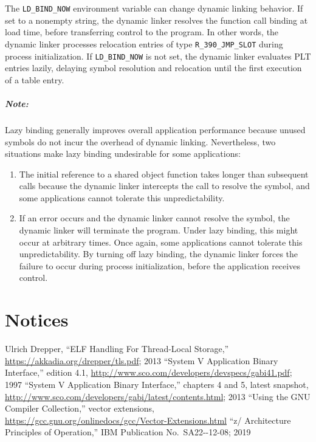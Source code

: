 \documentclass[english,11pt,twoside,toc=bib,toc=idx]{scrreprt}
\newcommand{\ARCH}{z/\kern-1pt Ar\-chi\-tec\-ture}
\newcommand{\ARCH}{ESA/390}
\begin{document}
The \texttt{LD\_BIND\_NOW} environment variable can change dynamic
linking behavior.  If set to a nonempty string, the dynamic linker
resolves the function call binding at load time, before transferring
control to the program.  In other words, the dynamic linker processes
relocation entries of type \texttt{R\_390\_JMP\_SLOT} during process
initialization.  If \texttt{LD\_BIND\_NOW} is not set, the dynamic
linker evaluates PLT entries lazily, delaying symbol resolution and
relocation until the first execution of a table entry.

\paragraph{Note:}
Lazy binding generally improves overall application performance
because unused symbols do not incur the overhead of dynamic
linking.  Nevertheless, two situations make lazy binding undesirable
for some applications:
\begin{enumerate}
\item The initial reference to a shared object function takes longer
  than subsequent calls because the dynamic linker intercepts the call
  to resolve the symbol, and some applications cannot tolerate this
  unpredictability.
\item If an error occurs and the dynamic linker cannot resolve the
  symbol, the dynamic linker will terminate the program.  Under lazy
  binding, this might occur at arbitrary times.  Once again, some
  applications cannot tolerate this unpredictability.  By turning off
  lazy binding, the dynamic linker forces the failure to occur during
  process initialization, before the application receives control.
\end{enumerate}

\appendix

\chapter{Notices}


\newcommand{\bibTitle}[1]{``#1''}

\begin{thebibliography}{9}
  Ulrich Drepper,
  \bibTitle{ELF Handling For Thread-Local Storage,}
  \url{https://akkadia.org/drepper/tls.pdf};
  2013
  \bibTitle{System V Application Binary Interface,}
  edition 4.1,
  \url{http://www.sco.com/developers/devspecs/gabi41.pdf};
  1997
  \bibTitle{System V Application Binary Interface,}
  chapters 4 and 5, latest snapshot,
  \url{http://www.sco.com/developers/gabi/latest/contents.html};
  2013
  \bibTitle{Using the GNU Compiler Collection,}
  vector extensions,
  \url{https://gcc.gnu.org/onlinedocs/gcc/Vector-Extensions.html}
  \bibTitle{\ARCH{} Principles of Operation,}
  IBM Publication No.~SA22-{-12-08\fi};
  2019
\end{thebibliography}

\printindex
\end{document}
